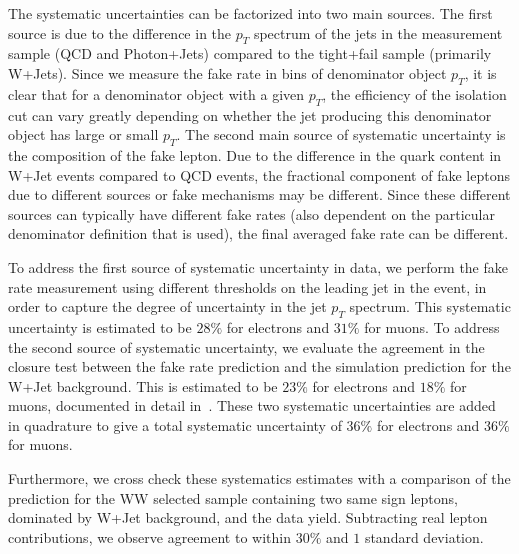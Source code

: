The systematic uncertainties can be factorized into two main sources. 
The first source is due to the difference in the $p_{T}$ spectrum 
of the jets in the measurement sample (QCD and Photon+Jets) compared
to the tight+fail sample (primarily W+Jets). Since we measure the 
fake rate in bins of denominator object $p_{T}$, it is clear that
for a denominator object with a given $p_{T}$, the efficiency of the
isolation cut can vary greatly depending on whether the jet producing
this denominator object has large or small $p_{T}$. The second main
source of systematic uncertainty is the composition of the fake lepton.
Due to the difference in the quark content in W+Jet events compared
to QCD events, the fractional component of fake leptons due to different 
sources or fake mechanisms may be different. Since these different sources
can typically have different fake rates (also dependent on the particular 
denominator definition that is used), the final averaged fake rate can 
be different.

To address the first source of systematic uncertainty in data, we perform the
fake rate measurement using different thresholds on the leading jet
in the event, in order to capture the degree of uncertainty in 
the jet $p_{T}$ spectrum. This systematic uncertainty is estimated to 
be $28\%$ for electrons and $31\%$ for muons. To address the second 
source of systematic uncertainty, we evaluate the agreement in the closure
test between the fake rate prediction and the simulation prediction for 
the W+Jet background. This is estimated to be $23\%$ for electrons
and $18\%$ for muons, documented in detail in~\cite{HWWAnalysis_Alpha}. These two 
systematic uncertainties are added in quadrature to give a total 
systematic uncertainty of $36\%$ for electrons and $36\%$ for muons. 

Furthermore, we cross check these systematics estimates with a comparison of the prediction 
for the WW selected sample containing two same sign leptons, dominated by W+Jet
background, and the data yield. Subtracting real lepton contributions,
we observe agreement to within $30\%$ and $1$ standard deviation.



